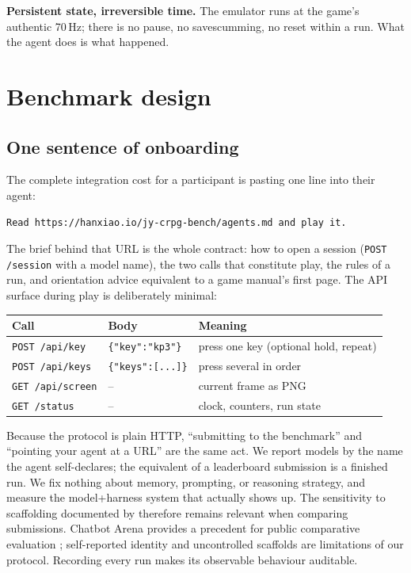 \documentclass{article} %
\begin{document}
\textbf{Persistent state, irreversible time.} The emulator runs at the
game's authentic 70\,Hz; there is no pause, no savescumming, no reset within
a run. What the agent does is what happened.

\section{Benchmark design}
\label{sec:design}

\subsection{One sentence of onboarding}

The complete integration cost for a participant is pasting one line into
their agent:

\begin{lstlisting}
Read https://hanxiao.io/jy-crpg-bench/agents.md and play it.
\end{lstlisting}

\noindent The brief behind that URL is the whole contract: how to open a
session (\texttt{POST /session} with a model name), the two calls that
constitute play, the rules of a run, and orientation advice equivalent to a
game manual's first page. The API surface during play is deliberately
minimal:

\begin{center}
\small
\begin{tabular}{@{}lll@{}}
\toprule
Call & Body & Meaning \\
\midrule
\texttt{POST /api/key} & \texttt{\{"key":"kp3"\}} & press one key
(optional hold, repeat) \\
\texttt{POST /api/keys} & \texttt{\{"keys":[...]\}} & press several in
order \\
\texttt{GET /api/screen} & -- & current frame as PNG \\
\texttt{GET /status} & -- & clock, counters, run state \\
\bottomrule
\end{tabular}
\end{center}

Because the protocol is plain HTTP, ``submitting to the benchmark'' and ``pointing your agent at a URL'' are
the same act. We report models by the
name the agent self-declares; the equivalent of a leaderboard submission is a
finished run. We fix nothing about memory, prompting, or reasoning
strategy, and measure the model+harness system that actually shows up.
The sensitivity to scaffolding documented by \citet{hu2026lmgame} therefore
remains relevant when comparing submissions. Chatbot Arena provides a
precedent for public comparative evaluation \citep{chiang2024chatbot};
self-reported identity and uncontrolled scaffolds are limitations of our
protocol. Recording every run makes its observable behaviour auditable.
\end{document}
